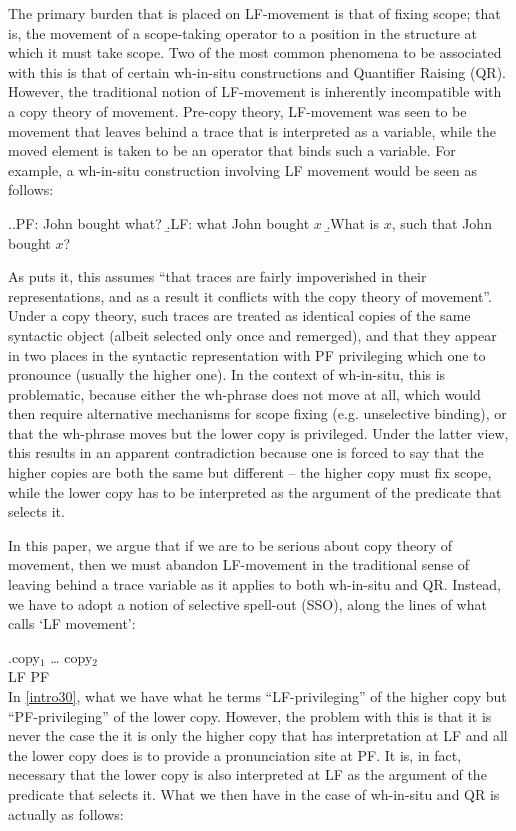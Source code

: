 \documentclass{glossa}
\begin{document}
The primary burden that is placed on LF-movement is that of fixing scope; that is, the movement of a scope-taking operator to a position in the structure at which it must take scope. Two of the most common phenomena to be associated with this is that of certain wh-in-situ constructions and Quantifier Raising (QR). However, the traditional notion of LF-movement is inherently incompatible with a copy theory of movement. Pre-copy theory, LF-movement was seen to be movement that leaves behind a trace that is interpreted as a variable, while the moved element is taken to be an operator that binds such a variable. For example, a wh-in-situ construction involving LF movement would be seen as follows:

\ex.\label{intro20}\a.PF: John bought what?
   \b.LF: what John bought $x$
   \b.What is $x$, such that John bought $x$?

As \cite{fox:2002} puts it, this assumes ``that traces are fairly impoverished in their representations, and as a result it conflicts with the copy theory of movement''. Under a copy theory, such traces are treated as identical copies of the same syntactic object (albeit selected only once and remerged), and that they appear in two places in the syntactic representation with PF privileging which one to pronounce (usually the higher one). In the context of wh-in-situ, this is problematic, because either the wh-phrase does not move at all, which would then require alternative mechanisms for scope fixing (e.g. unselective binding), or that the wh-phrase moves but the lower copy is privileged. Under the latter view, this results in an apparent contradiction because one is forced to say that the higher copies are both the same but different -- the higher copy must fix scope, while the lower copy has to be interpreted as the argument of the predicate that selects it.

In this paper, we argue that if we are to be serious about copy theory of movement, then we must abandon LF-movement in the traditional sense of leaving behind a trace variable as it applies to both wh-in-situ and QR. Instead, we have to adopt a notion of selective spell-out (SSO), along the lines of what \cite{bobaljik:2002} calls `LF movement':

\exg.\label{intro30}copy$_1$ {\dots} copy$_2$\\
   LF {} PF\\

In \ref{intro30}, what we have what he terms ``LF-privileging'' of the higher copy but ``PF-privileging'' of the lower copy. However, the problem with this is that it is never the case the it is only the higher copy that has interpretation at LF and all the lower copy does is to provide a pronunciation site at PF. It is, in fact, necessary that the lower copy is also interpreted at LF as the argument of the predicate that selects it. What we then have in the case of wh-in-situ and QR is actually as follows:
\end{document}
